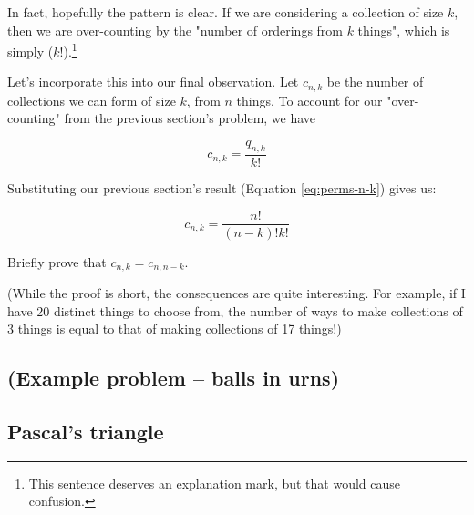 
In fact, hopefully the pattern is clear. If we are considering a collection of size $k$, then we are over-counting by the "number of orderings from $k$ things", which is simply ($k!$).\footnote{This sentence deserves an explanation mark, but that would cause confusion.} 

Let's incorporate this into our final observation. Let $c_{n,k}$ be the number of collections we can form of size $k$, from $n$ things. To account for our "over-counting" from the previous section's problem, we have

\begin{equation*}
c_{n,k} = \frac{q_{n,k}}{k!}
\end{equation*}

Substituting our previous section's result (Equation \ref{eq:perms-n-k}) gives us:

\begin{equation}
c_{n,k} = \frac{n!}{(n-k)! k!}
\end{equation}



\begin{exercise}
\label{ex:binom-coeff-symmetry}
Briefly prove that $c_{n,k} = c_{n,n-k}$.

(While the proof is short, the consequences are quite interesting. For example, if I have 20 distinct things to choose from, the number of ways to make collections of 3 things is equal to that of making collections of 17 things!)
\end{exercise}



\subsection{(Example problem -- balls in urns)}

\subsection{Pascal's triangle}


